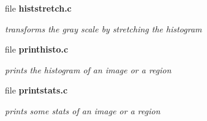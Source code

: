 \begin{DoxyCompactItemize}
\item 
file {\bf histstretch.c}


\begin{DoxyCompactList}\small\item\em transforms the gray scale by stretching the histogram \item\end{DoxyCompactList}

\item 
file {\bf printhisto.c}


\begin{DoxyCompactList}\small\item\em prints the histogram of an image or a region \item\end{DoxyCompactList}

\item 
file {\bf printstats.c}


\begin{DoxyCompactList}\small\item\em prints some stats of an image or a region \item\end{DoxyCompactList}

\end{DoxyCompactItemize}
